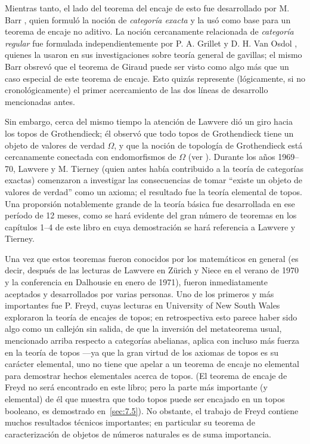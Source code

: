 Mientras tanto, el lado del teorema del encaje de esto fue desarrollado por M.
Barr \pend{[2]}, quien formuló la  noción de \emph{categoría exacta} y la usó
como base para un teorema de encaje no aditivo. La noción cercanamente
relacionada de \emph{categoría regular} fue formulada independientemente por P.
A. Grillet \pend{[41]} y D. H. Van Osdol \pend{[122]}, quienes la usaron en sus
investigaciones sobre teoría general de gavillas; el mismo Barr obsrevó que el
teorema de Giraud puede ser visto como algo más que un caso especial de este
teorema de encaje. Esto quizás represente (lógicamente, si no cronológicamente)
el primer acercamiento de las dos líneas de desarrollo mencionadas antes.

Sin embargo, cerca del mismo tiempo la atención de Lawvere dió un giro hacia los
topos de Grothendieck; él observó que todo topos de Grothendieck tiene un objeto
de valores de verdad \(\Omega\), y que la noción de topología de Grothendieck
está cercanamente conectada con endomorfismos de \(\Omega\) (ver \pend{[LH]}).
Durante los años 1969--70, Lawvere y M. Tierney (quien antes había contribuido a
la teoría de categorías exactas) comenzaron a investigar las consecuencias de
tomar \enquote{existe un objeto de valores de verdad} como un axioma; el
resultado fue la teoría elemental de topos. Una proporsión notablemente grande
de la teoría básica fue desarrollada en ese período de 12 meses, como se hará
evidente del gran número de teoremas en los capítulos 1--4 de este libro en cuya
demostración se hará referencia a Lawvere y Tierney. 

Una vez que estos teoremas fueron conocidos por los matemáticos en general (es
decir, después de las lecturas de Lawvere en Zürich y Niece \pend{[LN]} en el
verano de 1970 y la conferencia en Dalhousie \pend{[LH]} en enero de 1971),
fueron inmediatamente aceptados y desarrollados por varias personas. Uno de los
primeros y más importantes fue P. Freyd, cuyas lecturas en University of New
South Wales \pend{[FK]} exploraron la teoría de encajes de topos; en
retrospectiva esto parece haber sido algo como un callejón sin salida, de que la
inversión del metateorema usual, mencionado arriba respecto a categorías
abelianas, aplica con incluso más fuerza en la teoría de topos ---ya que la gran
virtud de los axiomas de topos es su carácter elemental, uno no tiene que apelar
a un teorema de encaje no elemental para demostrar hechos elementales acerca de
topos. (El teorema de encaje de Freyd no será encontrado en este libro; pero la
parte más importante (y elemental) de él que muestra que todo topos puede ser
encajado en un topos booleano, es demostrado en~\ref{sec:7.5}). No obstante,
el trabajo de Freyd contiene muchos resultados técnicos importantes; en
particular su teorema de caracterización de objetos de números naturales es de
suma importancia.

